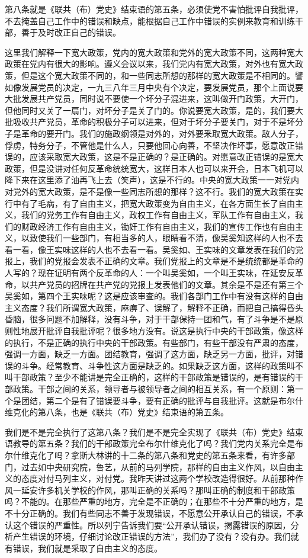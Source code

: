 第八条就是《联共（布）党史》结束语的第五条，必须使党不害怕批评自我批评，不去掩盖自己工作中的错误和缺点，能根据自己工作中错误的实例来教育和训练干部，善于及时改正自己的错误。

这里我们解释一下宽大政策，党内的宽大政策和党外的宽大政策不同，这两种宽大政策在党内有很大的影响。遵义会议以来，我们党内有宽大政策，对外也有宽大政策，但是这个宽大政策不同的，和一些同志所想的那样的宽大政策是不相同的。譬如像发展党员的决定，一九三八年三月中央有个决定，要发展党员，那个上面说要大批发展共产党员，同时说不要使一个坏分子混进来，这叫做开门政策，大开门，但他同时又关了一扇门，对坏分子是关了门的。你说要宽大政策，是的，我们要大批吸收共产党员，革命的积极分子可以进来，但对于坏分子要关门，对于不是坏分子是革命的要开门。我们的施政纲领是对外的，对外要釆取宽大政策。敌人分子，俘虏，特务分子，不管他是什么人，只要他回心向善，不坚决作坏事，愿意改正错误的，应该采取宽大政策，这是不是正确的？是正确的。对愿意改正错误的是宽大政策，但是没讲对任何反革命统统宽大，这样日本人也可以来开会，日本飞机可以降下来在这里添了油再飞上去（笑声），这是不行的。中央的宽大政策一一对党内对党外的宽大政策，是不是像一些同志所想的那样？这不行。我们的宽大政策在实行中有了毛病，有了自由主义，把宽大政策变为自由主义，在各方面生长了自由主义，我们的党务工作有自由主义，政权工作有自由主义，军队工作有自由主义，我们的财政经济工作有自由主义，锄奸工作有自由主义，我们的宣传工作也有自由主义，以致使我们一些部门，有相当多的人，眼睛看不清，像吴奚知这样的人也不去看一看，像王实味这样的人也不去看一看。吴奚如、王实味的文章发表在我们的党报上，我们的党报会发表不正确的文章。我们党报上的文章是不是统统都是革命的人写的？现在证明有两个反革命的人：一个叫吴奚如，一个叫王实味，在延安反革命，以共产党员的招牌在共产党的党报上发表他们的文章。其余是不是还有第三个吴奚如，第四个王实味呢？这是应该审查的。我们各部门工作中有没有这样的自由主义态度？我们所谓宽大政策，麻痹了、误解了，解释不正确，而把自己搞得昏头昏脑，很多问题不加解释，没有斗争，对于干部保持一团和气，有了斗争是不是原则性地展开批评自我批评呢？很多地方没有。说这是执行中央的干部政策，像这样的执行，不是正确的执行中央的干部政策。有些部门，有些干部没有严肃的态度，强调一方面，缺乏一方面。团结教育，强调了这方面，缺乏另一方面，批评，对错误的斗争。经常教育、斗争性这方面是缺乏的。如果缺乏这方面，这样的政策叫不叫干部政策？至少不能讲是完全正确的，这样的干部政策是错误的，是有错误的干部政策。干部之间的关系，领导者与被领导者之间的相互关系，有一个原则：第一个是团结，第二个是有了错误要斗争，要有正确的批评与自我批评。这就是布尔什维克化的第八条，也是《联共（布）党史》结束语的第五条。

我们是不是完全执行了这第八条？我们是不是完全实现了《联共（布）党史》结束语教导的第五条？我们的干部政策完全布尔什维克化了吗？我们党内关系完全是布尔什维克化了吗？拿斯大林讲的十二条的第八条和党史的第五条来看，有许多部门，过去如中央研究院，鲁艺，从前的马列学院，那样的自由主义作风，以自由主义的态度对付马列主义，对付党。我昨天讲过这两个学校改造得很好。从前那种作风一延安许多机关学校的作风，那叫正确的关系吗？那叫正确的制度和干部政策吗？不能的。在那些严重的地方，完全是不正确的；在那些不十分严重的地方，是不十分正确的。我们有些同志不善于发现错误，不愿意公开承认自己的错误，不承认这个错误的严重性。所以列宁告诉我们要“公开承认错误，揭露错误的原因，分析产生错误的环境，仔细讨论改正错误的方法”，我们办了没有？没有办。我们就有错误，我们就是采取了自由主义的态度。


